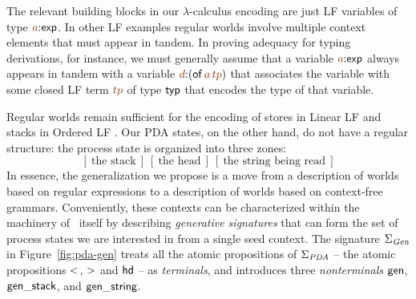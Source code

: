 The relevant building blocks in our $\lambda$-calculus encoding are
just LF variables of type $\lf{a}{:}{\sf exp}$. In other LF examples
regular worlds involve multiple context elements that must appear in
tandem. In proving adequacy for typing derivations, for instance, we
must generally assume that a variable $\lf{a}{:}{\sf exp}$ always
appears in tandem with a variable $\lf{d}{:}({\sf
  of}\,\lf{a}\,\lf{tp})$ that associates the variable with some closed
LF term $\lf{tp}$ of type ${\sf typ}$ that encodes the type of that
variable.

Regular worlds remain sufficient for the encoding of stores in Linear
LF \cite{cervesato02linear} and stacks in Ordered LF
\cite{polakow01ordered}. Our PDA states, on the other hand, do not have
a regular structure: the process state is organized into three
zones:
\[
[~\mbox{the stack}~]
~
[~\mbox{the head}~]
~
[~\mbox{the string being read}~]
\]
In essence, the generalization we propose is a move from a description
of worlds based on regular expressions to a description of worlds
based on context-free grammars. Conveniently, these contexts can be
characterized within the machinery of \sls~itself by describing {\it
  generative signatures} that can form the set of process states we
are interested in from a single seed context.  The signature
$\Sigma_{\it Gen}$ in Figure~\ref{fig:pda-gen} treats all the atomic
propositions of $\Sigma_{\it PDA}$ -- the atomic propositions ${\sf
  <}$, ${\sf >}$ and ${\sf hd}$ -- as {\it terminals}, and introduces
three {\it nonterminals} ${\sf gen}$, ${\sf gen\_stack}$, and ${\sf
  gen\_string}$.

